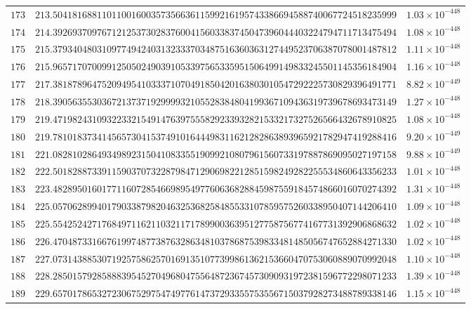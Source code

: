 \documentclass[12pt,reqno]{amsart}
\theoremstyle{remark}
\begin{document}
\begin{longtable}{clc}
$173$ & $213.5041816881101100160035735663611599216195743386694588740067724518235999$ & $1.03\times 10^{-448}$ \\
$174$ & $214.3926937097671212537302837600415603383745047396044403224794711713475494$ & $1.08\times 10^{-448}$ \\
$175$ & $215.3793404803109774942403132333703487516360363127449523706387078001487812$ & $1.11\times 10^{-448}$ \\
$176$ & $215.9657170700991250502490391053397565335951506499149833245501145356184904$ & $1.16\times 10^{-448}$ \\
$177$ & $217.3818789647520949541033371070491850420163803010547292225730829396491771$ & $8.82\times 10^{-449}$ \\
$178$ & $218.3905635530367213737192999932105528384804199367109436319739678693473149$ & $1.27\times 10^{-448}$ \\
$179$ & $219.4719824310932233215491476397555829233932821533217327526566432678910825$ & $1.08\times 10^{-448}$ \\
$180$ & $219.7810183734145657304153749101644498311621282863893965921782947419288416$ & $9.20\times 10^{-449}$ \\
$181$ & $221.0828102864934989231504108335519099210807961560733197887869095027197158$ & $9.88\times 10^{-449}$ \\
$182$ & $222.5018288733911590370732287984712906982212851598249282255534860643356233$ & $1.01\times 10^{-448}$ \\
$183$ & $223.4828950160177116072854669895497760636828845987559184574866016070274392$ & $1.31\times 10^{-448}$ \\
$184$ & $225.0570628994017903387982046325368258485533107859575260338950407144206410$ & $1.09\times 10^{-448}$ \\
$185$ & $225.5542524271768497116211032117178990036395127758756774167731392906868632$ & $1.02\times 10^{-448}$ \\
$186$ & $226.4704873316676199748773876328634810378687539833481485056747652884271330$ & $1.02\times 10^{-448}$ \\
$187$ & $227.0731438853071925758625701691351077399861362153660470753060889070992048$ & $1.10\times 10^{-448}$ \\
$188$ & $228.2850157928588839545270496804755648723674573090931972381596772298071233$ & $1.39\times 10^{-448}$ \\
$189$ & $229.6570178653272306752975474977614737293355753556715037928273488789338146$ & $1.15\times 10^{-448}$ \\

\end{longtable}
\end{document}
